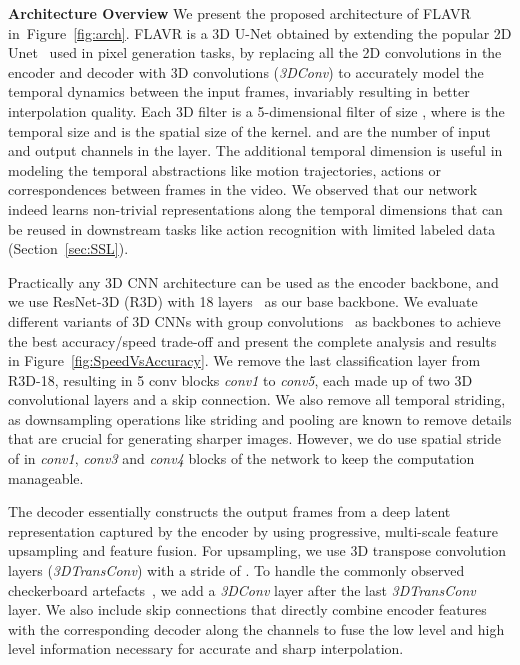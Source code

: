 \documentclass[10pt,twocolumn,letterpaper]{article}
\newcommand{\figref}[1]{Figure~\ref{#1}}
\newcommand{\secref}[1]{Section~\ref{#1}}
\newcommand{\Ours}{FLAVR}
\begin{document}
{\bf Architecture Overview} We present the proposed architecture of \Ours{} in~\figref{fig:arch}. \Ours{} is a 3D U-Net obtained by extending the popular 2D Unet~\cite{ronneberger2015u} used in pixel generation tasks, by replacing all the 2D convolutions in the encoder and decoder with 3D convolutions (\textit{3DConv}) to accurately model the temporal dynamics between the input frames, invariably resulting in better interpolation quality. Each 3D filter is a 5-dimensional filter of size , where  is the temporal size and  is the spatial size of the kernel.  and  are the number of input and output channels in the layer. The additional temporal dimension is useful in modeling the temporal abstractions like motion trajectories, actions or correspondences between frames in the video. We observed that our network indeed learns non-trivial representations along the temporal dimensions that can be reused in downstream tasks like action recognition with limited labeled data (\secref{sec:SSL}).

Practically any 3D CNN architecture can be used as the encoder backbone, and we use ResNet-3D (R3D) with 18 layers~\cite{tran2018closer} as our base backbone. We evaluate different variants of 3D CNNs with group convolutions~\cite{Tran19} as backbones to achieve the best accuracy/speed trade-off and present the complete analysis and results in \figref{fig:SpeedVsAccuracy}. We remove the last classification layer from R3D-18, resulting in 5 conv blocks \textit{conv1} to \textit{conv5}, each made up of two 3D convolutional layers and a skip connection.
We also remove all temporal striding, as downsampling operations like striding and pooling are known to remove details that are crucial for generating sharper images. However, we do use spatial stride of  in \textit{conv1}, \textit{conv3} and \textit{conv4} blocks of the network to keep the computation manageable.

The decoder essentially constructs the output frames from a deep latent representation captured by the encoder by using progressive, multi-scale feature upsampling and feature fusion. For upsampling, we use 3D transpose convolution layers (\textit{3DTransConv}) with a stride of . To handle the commonly observed checkerboard artefacts~\cite{odena2016deconvolution}, we add a \textit{3DConv} layer after the last \textit{3DTransConv} layer. We also include skip connections that directly combine encoder features with the corresponding decoder along the channels to fuse the low level and high level information necessary for accurate and sharp interpolation.
\end{document}
